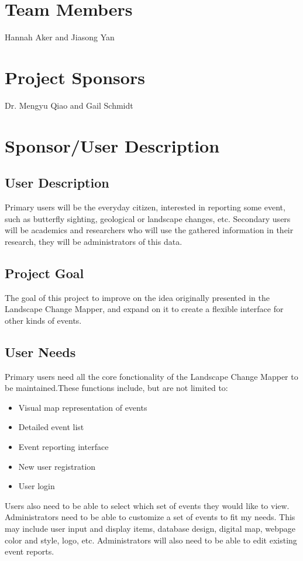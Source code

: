 
\section{Team Members}
Hannah Aker and Jiasong Yan
\section{Project Sponsors}
Dr. Mengyu Qiao and Gail Schmidt
\section{Sponsor/User Description}
\subsection{User Description}
Primary users will be the everyday citizen, interested in reporting some event, such as butterfly sighting, geological or landscape changes, etc. Secondary users will be academics and researchers who will use the gathered information in their research, they will be administrators of this data.
\subsection{Project Goal}
The goal of this project to improve on the idea originally presented in the Landscape Change Mapper, and expand on it to create a flexible interface for other kinds of events.
\subsection{User Needs}
Primary users need all the core fonctionality of the Landscape Change Mapper to be maintained.These functions include, but are not limited to:
\begin{itemize}
\item Visual map representation of events
\item Detailed event list
\item Event reporting interface
\item New user registration
\item User login
\end{itemize}
Users also need to be able to select which set of events they would like to view.
Administrators need to be able to customize a set of events to fit my needs. This may include user input and display items, database design, digital map, webpage color and style, logo, etc. Administrators will also need to be able to edit existing event reports.
